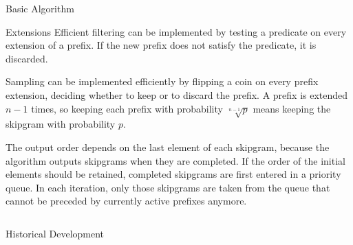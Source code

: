 \documentclass[final]{beamer}
\newcommand*{\pianoroll}{
  \draw (0,2) rectangle (1,2.4);
  \draw (1,2.4) rectangle (2,2.8);
  \draw (2,2) rectangle (2.5,2.4);
  \draw (2.5,1.6) rectangle (3,2);
  \draw (3,1.2) rectangle (3.5,1.6);
  \draw (3.5,0.8) rectangle (4,1.2);

  \draw (4,1.6) rectangle (5,2);
  \draw (5,2) rectangle (6,2.4);
  \draw (6,1.6) rectangle (6.5,2);
  \draw (6.5,1.2) rectangle (7,1.6);
  \draw (7,0.8) rectangle (7.5,1.2);
  \draw (7.5,0.4) rectangle (8,0.8);

  \draw (1,-0.4) rectangle (2,0);
  \draw (2,0) rectangle (4,0.4);
  \draw (5,-0.8) rectangle (6,-0.4);
  \draw (6,-0.4) rectangle (8,0);
}
\begin{document}
\begin{frame}[t]
\begin{minipage}[t][.56\textheight][t]{\textwidth}
\begin{columns}[t]
\begin{column}{0.3\textwidth}
\begin{block}{Basic Algorithm}
\begin{adjustbox}{scale=2,center,margin=0 1ex}
        \end{adjustbox}
      \end{block}

      \begin{block}{Extensions}
        Efficient \alert{filtering} can be implemented
        by \alert{testing a predicate} on every extension of a prefix.
        If the new prefix does not satisfy the predicate, it is discarded.

        \alert{Sampling} can be implemented efficiently
        by \alert{flipping a coin} on every prefix extension,
        deciding whether to keep or to discard the prefix.
        A prefix is extended $n-1$ times,
        so keeping each prefix with probability $\sqrt[n-1]{p}$
        means keeping the skipgram with probability $p$.

        The output order depends on the last element of each skipgram,
        because the algorithm outputs skipgrams when they are completed.
        If the \alert{order of the initial elements} should be retained,
        completed skipgrams are first entered in a \alert{priority queue}.
        In each iteration, only those skipgrams are taken from the queue
        that cannot be preceded by currently active prefixes anymore.
      \end{block}

    \end{column}
  \end{columns}

\end{minipage}

\begin{minipage}[t][.3\textheight][t]{\textwidth}
  \begin{block}{Historical Development}


\end{block}
\end{minipage}
\end{frame}
\end{document}
